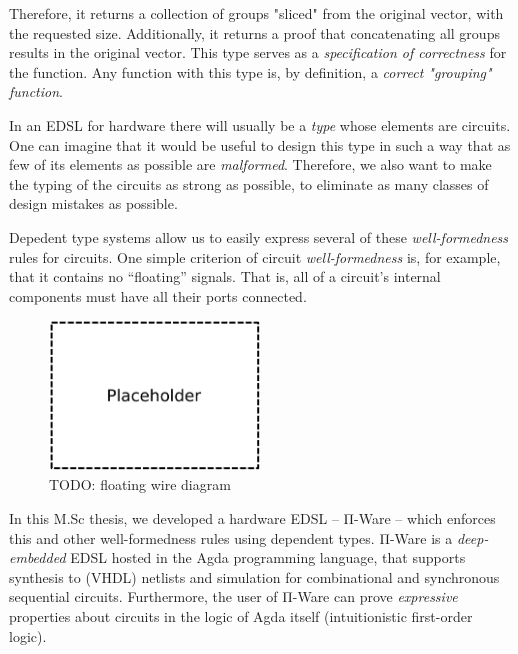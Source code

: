     Therefore, it returns a collection of groups "sliced" from the original vector, with the requested size.
    Additionally, it returns a proof that concatenating all groups results in the original vector.
    This type serves as a \emph{specification of correctness} for the function.
    Any function with this type is, by definition, a \emph{correct "grouping" function}.

    In an \ac{EDSL} for hardware there will usually be a \emph{type} whose elements are circuits.
    One can imagine that it would be useful to design this type
    in such a way that as few of its elements as possible are \emph{malformed}.
    Therefore, we also want to make the typing of the circuits as strong as possible,
    to eliminate as many classes of design mistakes as possible.


    Depedent type systems allow us to easily express several of these \emph{well-formedness} rules for circuits.
    One simple criterion of circuit \emph{well-formedness} is, for example, that it contains no ``floating'' signals.
    That is, all of a circuit's internal components must have all their ports connected.

    \begin{figure}[h]
        \centerline{\includegraphics[width=0.5\textwidth]{imgs/floating-wire.pdf}}
        \caption{TODO: floating wire diagram \label{fig:floating-wire}}
    \end{figure}

    In this M.Sc thesis, we developed a hardware \ac{EDSL} -- Π-Ware -- which enforces this and other
    well-formedness rules using dependent types.
    Π-Ware is a \emph{deep-embedded} \ac{EDSL} hosted in the Agda programming language,
    that supports synthesis to (\acs{VHDL}) netlists and simulation for combinational and synchronous sequential circuits.
    Furthermore, the user of Π-Ware can prove \emph{expressive} properties about circuits in the logic
    of Agda itself (intuitionistic first-order logic).

